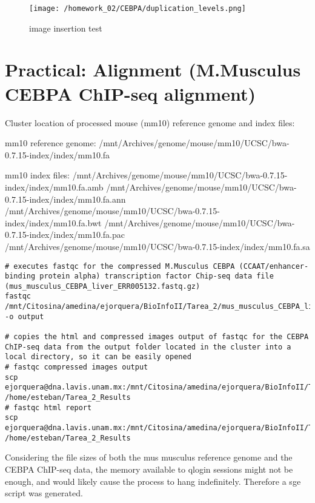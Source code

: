 \documentclass[
]{article}
\begin{document}
\begin{figure}
\centering
\texttt{[image: /homework\_02/CEBPA/duplication\_levels.png]}
\caption{image insertion test}
\end{figure}

\hypertarget{practical-alignment-m.musculus-cebpa-chip-seq-alignment}{%
\section{Practical: Alignment (M.Musculus CEBPA ChIP-seq
alignment)}\label{practical-alignment-m.musculus-cebpa-chip-seq-alignment}}

Cluster location of processed mouse (mm10) reference genome and index
files:

mm10 reference genome:
/mnt/Archives/genome/mouse/mm10/UCSC/bwa-0.7.15-index/index/mm10.fa

mm10 index files:
/mnt/Archives/genome/mouse/mm10/UCSC/bwa-0.7.15-index/index/mm10.fa.amb
/mnt/Archives/genome/mouse/mm10/UCSC/bwa-0.7.15-index/index/mm10.fa.ann
/mnt/Archives/genome/mouse/mm10/UCSC/bwa-0.7.15-index/index/mm10.fa.bwt
/mnt/Archives/genome/mouse/mm10/UCSC/bwa-0.7.15-index/index/mm10.fa.pac
/mnt/Archives/genome/mouse/mm10/UCSC/bwa-0.7.15-index/index/mm10.fa.sa

\begin{verbatim}
# executes fastqc for the compressed M.Musculus CEBPA (CCAAT/enhancer-binding protein alpha) transcription factor Chip-seq data file (mus_musculus_CEBPA_liver_ERR005132.fastq.gz)
fastqc /mnt/Citosina/amedina/ejorquera/BioInfoII/Tarea_2/mus_musculus_CEBPA_liver_ERR005132.fastq.gz -o output

# copies the html and compressed images output of fastqc for the CEBPA ChIP-seq data from the output folder located in the cluster into a local directory, so it can be easily opened 
# fastqc compressed images output
scp ejorquera@dna.lavis.unam.mx:/mnt/Citosina/amedina/ejorquera/BioInfoII/Tarea_2/output/mus_musculus_CEBPA_liver_ERR005132_fastqc.zip /home/esteban/Tarea_2_Results
# fastqc html report
scp ejorquera@dna.lavis.unam.mx:/mnt/Citosina/amedina/ejorquera/BioInfoII/Tarea_2/output/mus_musculus_CEBPA_liver_ERR005132_fastqc.html /home/esteban/Tarea_2_Results
\end{verbatim}

Considering the file sizes of both the mus musculus reference genome and
the CEBPA ChIP-seq data, the memory available to qlogin sessions might
not be enough, and would likely cause the process to hang indefinitely.
Therefore a sge script was generated.
\end{document}
